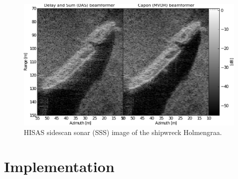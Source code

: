 \documentclass[10pt,a4paper]{article}
\newcommand\sumb[2]{\sum\limits_{#1}^{#2}\,}
\newcommand\1{\vec 1}
\begin{document}


\newpage
\begin{figure}[!t]
\centering
\includegraphics[width=\linewidth]{gfx/img_holmengraa.pdf}
\caption{HISAS sidescan sonar (SSS) image of the shipwreck Holmengraa.}\label{holmengraa}
\end{figure}


\section{Implementation}
\end{document}
